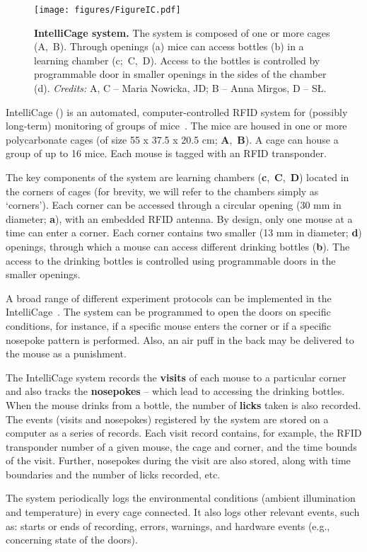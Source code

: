 
\begin{figure*}
  \texttt{[image: figures/FigureIC.pdf]}
  \caption{
    {\bf IntelliCage system.} 
    The system is composed of one or more cages (A,~B).
    Through openings (a) mice can access bottles (b) in a learning chamber (c;~C,~D).
    Access to the bottles is controlled by programmable door in smaller openings in the sides
    of the chamber (d). \emph{Credits:} A, C -- Maria Nowicka, JD; B -- Anna Mirgos, D -- SŁ.
  }
  \label{intellicageSystem}
\end{figure*}

IntelliCage () is an automated, computer-controlled RFID system for
(possibly long-term) monitoring of groups of
mice~\cite{Galsworthy:2005br,Krackow:2010ck,Puscian:2014cu}. The mice are housed in 
one or more polycarbonate cages (of size 55 x 37.5 x 20.5 cm;
\textbf{A},~\textbf{B}). A cage can house a group of up to
16 mice. Each mouse is tagged with an RFID transponder.

The key components of the system are learning chambers
(\textbf{c},~\textbf{C},~\textbf{D}) 
located in the corners of cages
(for brevity, we will refer to the chambers simply as `corners'). Each
corner can be accessed through a circular opening (30 mm in diameter; \textbf{a}),
with an embedded RFID antenna. By design, only one mouse at a time can enter
a corner. Each corner contains two smaller (13 mm in diameter; \textbf{d}) openings,
through which a mouse can access different drinking bottles (\textbf{b}). The access to the
drinking bottles is controlled using programmable doors in
the smaller openings.


A broad range of different experiment protocols can be implemented in the
IntelliCage~\cite{Knapska:2006cz,Kiryk:2011tk,Endo:2011bs,Radwanska:2012fd,Knapska:2013dj,Smutek:2014da,Puscian:2014cu,Vannoni:2014jt}.
The system can be programmed to open the doors on specific conditions, for
instance, if a specific mouse enters the corner or if a specific nosepoke
pattern is performed. Also, an air puff in the back may be delivered to the
mouse as a punishment.

The IntelliCage system records the \textbf{visits} of
each mouse to a particular corner and also tracks the \textbf{nosepokes}
-- which lead to accessing the drinking bottles. When the mouse drinks
from a bottle, the number of \textbf{licks} taken is also recorded.
The events (visits and nosepokes) registered by the system are stored on a
computer as a series of records. Each visit record contains, for example,
the RFID transponder number of a given mouse, the cage and corner,
and the time bounds of the visit. Further,
nosepokes during the visit are also stored, along with
time boundaries and the number of licks recorded, etc.

The system periodically logs the environmental conditions (ambient
illumination and temperature) in every cage connected. It also logs other
relevant events, such as: starts or ends of recording, errors, warnings, and
hardware events (e.g., concerning state of the doors).
